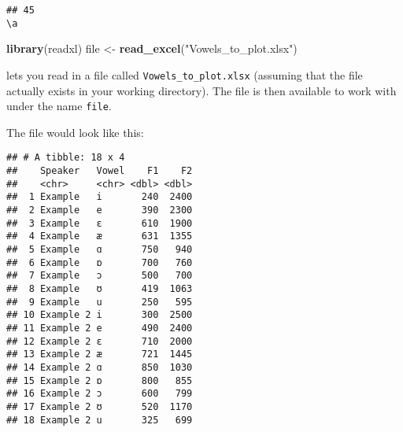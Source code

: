 \documentclass[
]{article}
\newenvironment{Shaded}{\begin{snugshade}}{\end{snugshade}}
\newcommand{\FunctionTok}[1]{\textcolor[rgb]{0.13,0.29,0.53}{\textbf{#1}}}
\newcommand{\NormalTok}[1]{#1}
\newcommand{\OtherTok}[1]{\textcolor[rgb]{0.56,0.35,0.01}{#1}}
\newcommand{\StringTok}[1]{\textcolor[rgb]{0.31,0.60,0.02}{#1}}
\begin{document}
\begin{verbatim}
## 45                                                                                                                                                                                                                                                                                                                                                                                                                                                                                                                                                                                                                                                                                                                                                                                                                                                                                                         \a
\end{verbatim}

\begin{Shaded}
\begin{Highlighting}[]
\FunctionTok{library}\NormalTok{(readxl)}
\NormalTok{file }\OtherTok{\textless{}{-}} \FunctionTok{read\_excel}\NormalTok{(}\StringTok{"Vowels\_to\_plot.xlsx"}\NormalTok{)}
\end{Highlighting}
\end{Shaded}

lets you read in a file called
\texttt{\textquotesingle{}Vowels\_to\_plot.xlsx\textquotesingle{}}
(assuming that the file actually exists in your working directory). The
file is then available to work with under the name \texttt{file}.

The file would look like this:

\begin{verbatim}
## # A tibble: 18 x 4
##    Speaker   Vowel    F1    F2
##    <chr>     <chr> <dbl> <dbl>
##  1 Example   i       240  2400
##  2 Example   e       390  2300
##  3 Example   ɛ       610  1900
##  4 Example   æ       631  1355
##  5 Example   ɑ       750   940
##  6 Example   ɒ       700   760
##  7 Example   ɔ       500   700
##  8 Example   ʊ       419  1063
##  9 Example   u       250   595
## 10 Example 2 i       300  2500
## 11 Example 2 e       490  2400
## 12 Example 2 ɛ       710  2000
## 13 Example 2 æ       721  1445
## 14 Example 2 ɑ       850  1030
## 15 Example 2 ɒ       800   855
## 16 Example 2 ɔ       600   799
## 17 Example 2 ʊ       520  1170
## 18 Example 2 u       325   699
\end{verbatim}
\end{document}
